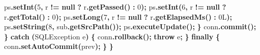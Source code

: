 \documentclass[
  11pt,
]{ctexart}
\newenvironment{Shaded}{\begin{snugshade}}{\end{snugshade}}
\newcommand{\BuiltInTok}[1]{#1}
\newcommand{\ControlFlowTok}[1]{\textcolor[rgb]{0.13,0.29,0.53}{\textbf{#1}}}
\newcommand{\DecValTok}[1]{\textcolor[rgb]{0.00,0.00,0.81}{#1}}
\newcommand{\FunctionTok}[1]{\textcolor[rgb]{0.13,0.29,0.53}{\textbf{#1}}}
\newcommand{\KeywordTok}[1]{\textcolor[rgb]{0.13,0.29,0.53}{\textbf{#1}}}
\newcommand{\NormalTok}[1]{#1}
\newcommand{\OperatorTok}[1]{\textcolor[rgb]{0.81,0.36,0.00}{\textbf{#1}}}
\begin{document}
\begin{Shaded}
\begin{Highlighting}[]
\NormalTok{                ps}\OperatorTok{.}\FunctionTok{setInt}\OperatorTok{(}\DecValTok{5}\OperatorTok{,}\NormalTok{ r }\OperatorTok{!=} \KeywordTok{null} \OperatorTok{?}\NormalTok{ r}\OperatorTok{.}\FunctionTok{getPassed}\OperatorTok{()} \OperatorTok{:} \DecValTok{0}\OperatorTok{);}
\NormalTok{                ps}\OperatorTok{.}\FunctionTok{setInt}\OperatorTok{(}\DecValTok{6}\OperatorTok{,}\NormalTok{ r }\OperatorTok{!=} \KeywordTok{null} \OperatorTok{?}\NormalTok{ r}\OperatorTok{.}\FunctionTok{getTotal}\OperatorTok{()} \OperatorTok{:} \DecValTok{0}\OperatorTok{);}
\NormalTok{                ps}\OperatorTok{.}\FunctionTok{setLong}\OperatorTok{(}\DecValTok{7}\OperatorTok{,}\NormalTok{ r }\OperatorTok{!=} \KeywordTok{null} \OperatorTok{?}\NormalTok{ r}\OperatorTok{.}\FunctionTok{getElapsedMs}\OperatorTok{()} \OperatorTok{:} \DecValTok{0L}\OperatorTok{);}
\NormalTok{                ps}\OperatorTok{.}\FunctionTok{setString}\OperatorTok{(}\DecValTok{8}\OperatorTok{,}\NormalTok{ sub}\OperatorTok{.}\FunctionTok{getSrcPath}\OperatorTok{());}
\NormalTok{                ps}\OperatorTok{.}\FunctionTok{executeUpdate}\OperatorTok{();}
            \OperatorTok{\}}
\NormalTok{            conn}\OperatorTok{.}\FunctionTok{commit}\OperatorTok{();}
        \OperatorTok{\}} \ControlFlowTok{catch} \OperatorTok{(}\BuiltInTok{SQLException}\NormalTok{ e}\OperatorTok{)} \OperatorTok{\{}
\NormalTok{            conn}\OperatorTok{.}\FunctionTok{rollback}\OperatorTok{();}
            \ControlFlowTok{throw}\NormalTok{ e}\OperatorTok{;}
        \OperatorTok{\}} \ControlFlowTok{finally} \OperatorTok{\{}
\NormalTok{            conn}\OperatorTok{.}\FunctionTok{setAutoCommit}\OperatorTok{(}\NormalTok{prev}\OperatorTok{);}
        \OperatorTok{\}}
    \OperatorTok{\}}


\end{Highlighting}
\end{Shaded}
\end{document}

